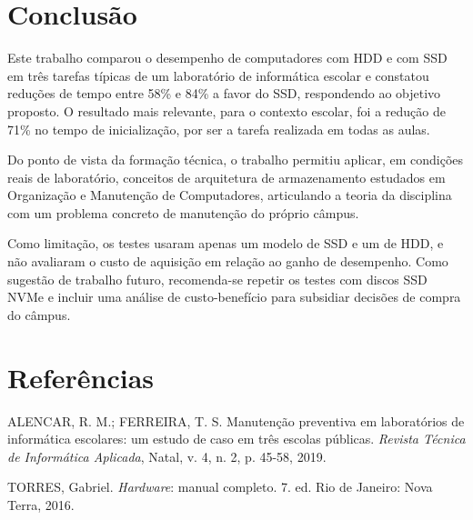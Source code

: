 \documentclass[article,12pt,a4paper]{abntex2}
\begin{document}
\section{Conclusão}

Este trabalho comparou o desempenho de computadores com HDD e com SSD em
três tarefas típicas de um laboratório de informática escolar e constatou
reduções de tempo entre 58\% e 84\% a favor do SSD, respondendo ao objetivo
proposto. O resultado mais relevante, para o contexto escolar, foi a redução
de 71\% no tempo de inicialização, por ser a tarefa realizada em todas as
aulas.

Do ponto de vista da formação técnica, o trabalho permitiu aplicar, em
condições reais de laboratório, conceitos de arquitetura de armazenamento
estudados em Organização e Manutenção de Computadores, articulando a teoria
da disciplina com um problema concreto de manutenção do próprio câmpus.

Como limitação, os testes usaram apenas um modelo de SSD e um de HDD, e não
avaliaram o custo de aquisição em relação ao ganho de desempenho. Como
sugestão de trabalho futuro, recomenda-se repetir os testes com discos SSD
NVMe e incluir uma análise de custo-benefício para subsidiar decisões de
compra do câmpus.

\postextual

\section*{Referências}

\newcommand{\referencia}[1]{\par\noindent\hangindent=1cm #1\par\medskip}

\referencia{ALENCAR, R. M.; FERREIRA, T. S. Manutenção preventiva em
laboratórios de informática escolares: um estudo de caso em três escolas
públicas. \textit{Revista Técnica de Informática Aplicada}, Natal, v. 4,
n. 2, p. 45-58, 2019.}

\referencia{TORRES, Gabriel. \textit{Hardware}: manual completo. 7. ed. Rio
de Janeiro: Nova Terra, 2016.}
\end{document}
